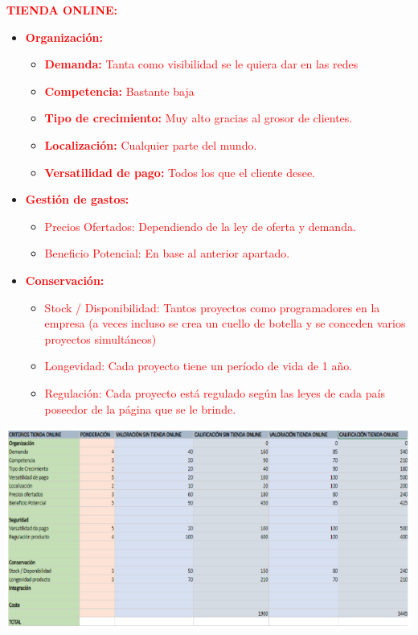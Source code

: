 \documentclass{article}
\begin{document}
\begin{itemize}
\textcolor{Red}{\textbf{TIENDA ONLINE:}}
\begin{itemize}
\item \textcolor{Red}{\textbf{Organización:}}
\begin{itemize}
\item \textcolor{Red}{\textbf{Demanda:} Tanta como visibilidad se le quiera dar en las redes}
\item \textcolor{Red}{\textbf{Competencia:} Bastante baja}
\item \textcolor{Red}{\textbf{Tipo de crecimiento:} Muy alto gracias al grosor de clientes.}
\item \textcolor{Red}{\textbf{Localización:} Cualquier parte del mundo.}
\item \textcolor{Red}{\textbf{Versatilidad de pago:} Todos los que el cliente desee.}
\end{itemize}
\item \textcolor{Red}{\textbf{Gestión de gastos:}}
\begin{itemize}
\item \textcolor{Red}{Precios Ofertados: Dependiendo de la ley de oferta y demanda.}
\item \textcolor{Red}{Beneficio Potencial: En base al anterior apartado.}
\end{itemize}
\item \textcolor{Red}{\textbf{Conservación:}}
\begin{itemize}
\item \textcolor{Red}{Stock / Disponibilidad: Tantos proyectos como programadores en la empresa (a veces incluso se crea un cuello de botella y se conceden varios proyectos simultáneos)}
\item \textcolor{Red}{Longevidad: Cada proyecto tiene un período de vida de 1 año.}
\item \textcolor{Red}{Regulación: Cada proyecto está regulado según las leyes de cada país poseedor de la página que se le brinde.}
\end{itemize}
\end{itemize}

\begin{center}
\includegraphics[scale=0.5]{images/tienda.png}
\end{center}


\end{itemize}
\end{document}
